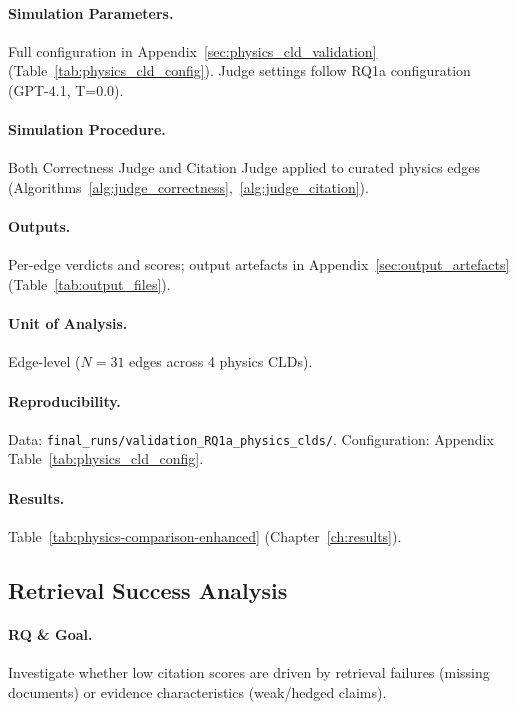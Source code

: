 \paragraph{Simulation Parameters.}
Full configuration in Appendix~\ref{sec:physics_cld_validation} (Table~\ref{tab:physics_cld_config}). Judge settings follow RQ1a configuration (GPT-4.1, T=0.0).

\paragraph{Simulation Procedure.}
Both Correctness Judge and Citation Judge applied to curated physics edges (Algorithms~\ref{alg:judge_correctness},~\ref{alg:judge_citation}).

\paragraph{Outputs.}
Per-edge verdicts and scores; output artefacts in Appendix~\ref{sec:output_artefacts} (Table~\ref{tab:output_files}).

\paragraph{Unit of Analysis.}
Edge-level ($N=31$ edges across 4 physics CLDs).

\paragraph{Reproducibility.}
Data: \texttt{final\_runs/validation\_RQ1a\_physics\_clds/}. Configuration: Appendix Table~\ref{tab:physics_cld_config}.

\paragraph{Results.}
Table~\ref{tab:physics-comparison-enhanced} (Chapter~\ref{ch:results}).

\subsection{Retrieval Success Analysis}
\label{sec:retrieval_success}

\paragraph{RQ \& Goal.}
Investigate whether low citation scores are driven by retrieval failures (missing documents) or evidence characteristics (weak/hedged claims).

